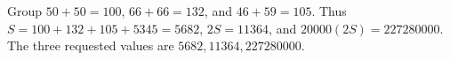 Group $50+50=100$, $66+66=132$, and $46+59=105$. Thus $S=100+132+105+5345=5682$, $2S=11364$, and $20000(2S)=\boxed{227280000}$. The three requested values are $5682,11364,227280000$.
